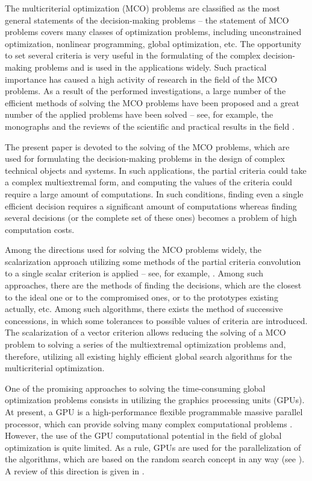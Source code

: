 \documentclass[runningheads]{llncs}
\begin{document}
The multicriterial optimization (MCO) problems are classified as the most general statements of the decision-making problems -- the statement of MCO problems covers many classes of optimization problems, including unconstrained optimization, nonlinear programming, global optimization, etc. The opportunity to set several criteria is very useful in the formulating of the complex decision-making problems and is used in the applications widely. Such practical importance has caused a high activity of research in the field of the MCO problems. As a result of the performed investigations, a large number of the efficient methods of solving the MCO problems have been proposed and a great number of the applied problems have been solved -- see, for example, the monographs \cite{c2,c3,c4,c5} and the reviews of the scientific and practical results in the field \cite{c7,c9}. 

The present paper is devoted to the solving of the MCO problems, which are used for formulating the decision-making problems in the design of complex technical objects and systems. In such applications, the partial criteria could take a complex multiextremal form, and computing the values of the criteria could require a large amount of computations. In such conditions, finding even a single efficient decision requires a significant amount of computations whereas finding several decisions (or the complete set of these ones) becomes a problem of high computation costs.  

Among the directions used for solving the MCO problems widely, the scalarization approach utilizing some methods of the partial criteria convolution to a single scalar criterion is applied -- see, for example, \cite{c3,c5,c10}. Among such approaches, there are the methods of finding the decisions, which are the closest to the ideal one or to the compromised ones, or to the prototypes existing actually, etc. Among such algorithms, there exists the method of successive concessions, in which some tolerances to possible values of criteria are introduced. The scalarization of a vector criterion allows reducing the solving of a MCO problem to solving a series of the multiextremal optimization problems and, therefore, utilizing all existing highly efficient global search algorithms for the multicriterial optimization. 

One of the promising approaches to solving the time-consuming global optimization problems consists in utilizing the graphics processing units (GPUs). At present, a GPU is a high-performance flexible programmable massive parallel processor, which can provide solving many complex computational problems \cite{c18}. However, the use of the GPU computational potential in the field of global optimization is quite limited. As a rule, GPUs are used for the parallelization of the algorithms, which are based on the random search concept in any way (see \cite{c19,c20,c21}). A review of this direction is given in \cite{c22}. 
\end{document}
